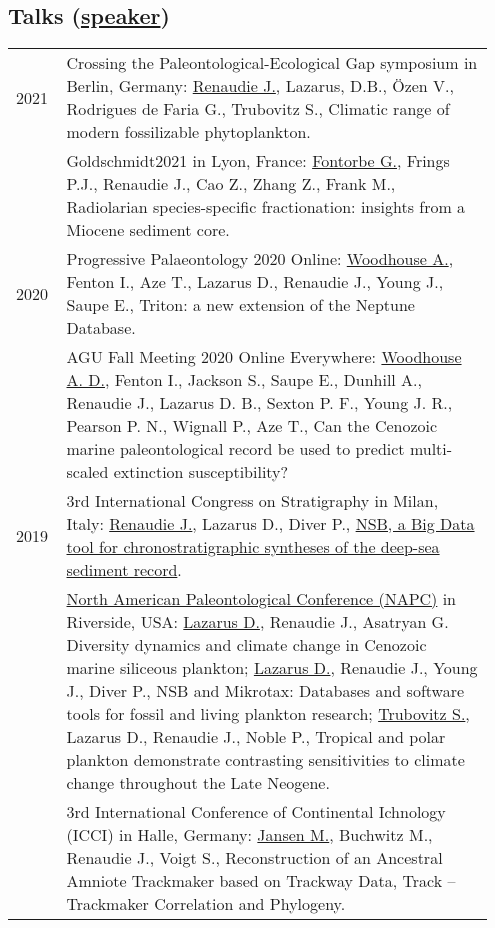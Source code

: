 \documentclass[11pt, a4paper]{article}
\begin{document}
\subsection[Talks]{Talks \textnormal{\footnotesize{(\underline{speaker})}}}
\begin{longtable}{@{}p{0.1\linewidth} P{0.85\linewidth}@{}}
2021 & Crossing the Paleontological-Ecological Gap symposium in Berlin, Germany: \underline{Renaudie J.}, Lazarus, D.B., Özen V., Rodrigues de Faria G., Trubovitz S., Climatic range of modern fossilizable phytoplankton.\\
& Goldschmidt2021 in Lyon, France: \underline{Fontorbe G.}, Frings P.J., Renaudie J., Cao Z., Zhang Z., Frank M., Radiolarian species-specific fractionation: insights from a Miocene sediment core.\\
2020 & Progressive Palaeontology 2020 Online: \underline{Woodhouse A.}, Fenton I., Aze T., Lazarus D., Renaudie J., Young J., Saupe E., Triton: a new extension of the Neptune Database.\\
 & AGU Fall Meeting 2020 Online Everywhere: \underline{Woodhouse A. D.}, Fenton I., Jackson S., Saupe E., Dunhill A., Renaudie J., Lazarus D. B., Sexton P. F., Young J. R., Pearson P. N., Wignall P., Aze T., Can the Cenozoic marine paleontological record be used to predict multi-scaled extinction susceptibility? \\
2019 & 3rd International Congress on Stratigraphy in Milan, Italy: \underline{Renaudie J.}, Lazarus D., Diver P., \href{http://plannapus.github.io/data/20190723Potsdam.pdf}{NSB, a Big Data tool for chronostratigraphic syntheses of the deep-sea sediment record}.\\
 & \href{https://escholarship.org/uc/item/6r18f8wn}{North American Paleontological Conference (NAPC)} in Riverside, USA: \underline{Lazarus D.}, Renaudie J., Asatryan G. Diversity dynamics and climate change in Cenozoic marine siliceous plankton; \underline{Lazarus D.}, Renaudie J., Young J., Diver P., NSB and Mikrotax: Databases and software tools for fossil and living plankton research; \underline{Trubovitz S.}, Lazarus D., Renaudie J., Noble P., Tropical and polar plankton demonstrate contrasting sensitivities to climate change throughout the Late Neogene.\\
 & 3rd International Conference of Continental Ichnology (ICCI) in Halle, Germany: \underline{Jansen M.}, Buchwitz M., Renaudie J., Voigt S., Reconstruction of an Ancestral Amniote Trackmaker based on Trackway Data, Track -- Trackmaker Correlation and Phylogeny.\\

\end{longtable}
\end{document}
